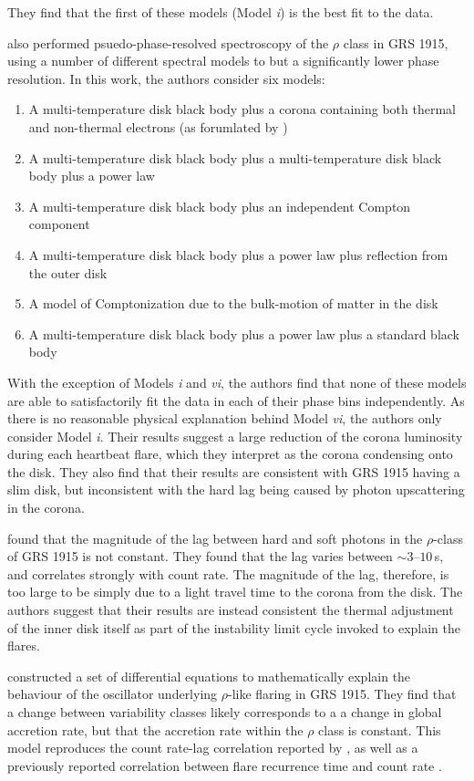 They find that the first of these models (Model \textit{i}) is the best fit to the data.
\par \citealp{Mineo_PhasRes} also performed psuedo-phase-resolved spectroscopy of the $\rho$ class in GRS 1915, using a number of different spectral models to \citealp{Neilsen_GRSModel} but a significantly lower phase resolution.  In this work, the authors consider six models:
\begin{enumerate}
\item A multi-temperature disk black body plus a corona containing both thermal and non-thermal electrons (as forumlated by \citealp{Poutanen_Hybrid})
\item A multi-temperature disk black body plus a multi-temperature disk black body plus a power law
\item A multi-temperature disk black body plus an independent Compton component
\item A multi-temperature disk black body plus a power law plus reflection from the outer disk
\item A model of Comptonization due to the bulk-motion of matter in the disk
\item A multi-temperature disk black body plus a power law plus a standard black body
\end{enumerate}
With the exception of Models \textit{i} and \textit{vi}, the authors find that none of these models are able to satisfactorily fit the data in each of their phase bins independently.  As there is no reasonable physical explanation behind Model \textit{vi}, the authors only consider Model \textit{i}.  Their results suggest a large reduction of the corona luminosity during each heartbeat flare, which they interpret as the corona condensing onto the disk.  They also find that their results are consistent with GRS 1915 having a slim disk, but inconsistent with the hard lag being caused by photon upscattering in the corona.
\par \citealp{Massa_MoveLag} found that the magnitude of the lag between hard and soft photons in the $\rho$-class of GRS 1915 is not constant.  They found that the lag varies between $\sim3$--$10$\,s, and correlates strongly with count rate.  The magnitude of the lag, therefore, is too large to be simply due to a light travel time to the corona from the disk.  The authors suggest that their results are instead consistent the thermal adjustment of the inner disk itself as part of the instability limit cycle invoked to explain the flares.
\par \citealp{Massaro_DiffEq} constructed a set of differential equations to mathematically explain the behaviour of the oscillator underlying $\rho$-like flaring in GRS 1915.  They find that a change between variability classes likely corresponds to a a change in global accretion rate, but that the accretion rate within the $\rho$ class is constant.  This model reproduces the count rate-lag correlation reported by \citealp{Massa_MoveLag}, as well as a previously reported correlation between flare recurrence time and count rate \citep{Massaro_Lag}.
